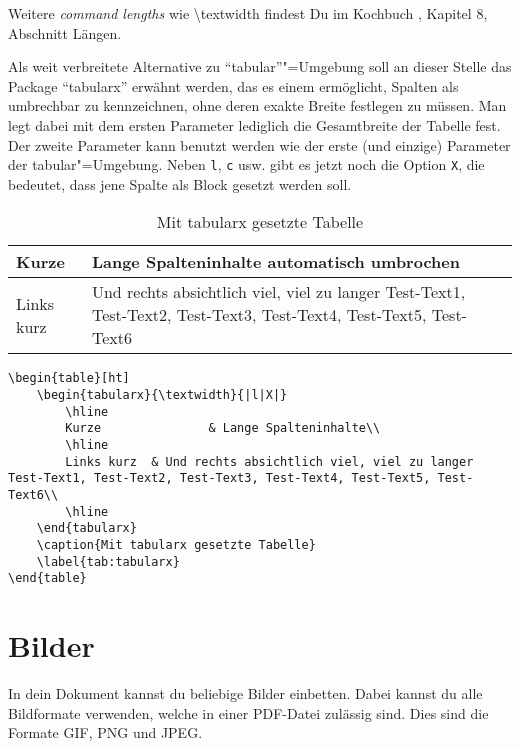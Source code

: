 Weitere \textit{command lengths} wie \textbackslash textwidth findest Du im Kochbuch \cite{Kochbuch}, Kapitel 8, Abschnitt Längen.

	Als weit verbreitete Alternative zu \enquote{tabular}"=Umgebung soll an dieser Stelle das Package \enquote{tabularx} erwähnt werden, das es einem ermöglicht, Spalten als umbrechbar zu kennzeichnen, ohne deren exakte Breite festlegen zu müssen. Man legt dabei mit dem ersten Parameter lediglich die Gesamtbreite der Tabelle fest. Der zweite Parameter kann benutzt werden wie der erste (und einzige) Parameter der tabular"=Umgebung. Neben \texttt{l}, \texttt{c} usw. gibt es jetzt noch die Option \texttt{X}, die bedeutet, dass jene Spalte als Block gesetzt werden soll.
\begin{table}[ht]
	\begin{tabularx}{\textwidth}{|l|X|}
		\hline
		Kurze				& Lange Spalteninhalte automatisch umbrochen\\
		\hline
		Links kurz	& Und rechts absichtlich viel, viel zu langer Test-Text1, Test-Text2, Test-Text3, Test-Text4, Test-Text5, Test-Text6\\
		\hline
		\end{tabularx}
	\caption{Mit tabularx gesetzte Tabelle}
	\label{tab:tabularx}
\end{table}

\begin{lstlisting}
\begin{table}[ht]	
	\begin{tabularx}{\textwidth}{|l|X|}
		\hline
		Kurze				& Lange Spalteninhalte\\
		\hline
		Links kurz	& Und rechts absichtlich viel, viel zu langer Test-Text1, Test-Text2, Test-Text3, Test-Text4, Test-Text5, Test-Text6\\
		\hline			
	\end{tabularx}
	\caption{Mit tabularx gesetzte Tabelle}
	\label{tab:tabularx}
\end{table}
\end{lstlisting}

\section{Bilder}

In dein Dokument kannst du beliebige Bilder einbetten. Dabei kannst du alle Bildformate verwenden, welche in einer PDF-Datei zulässig sind. Dies sind die Formate GIF, PNG und JPEG.

